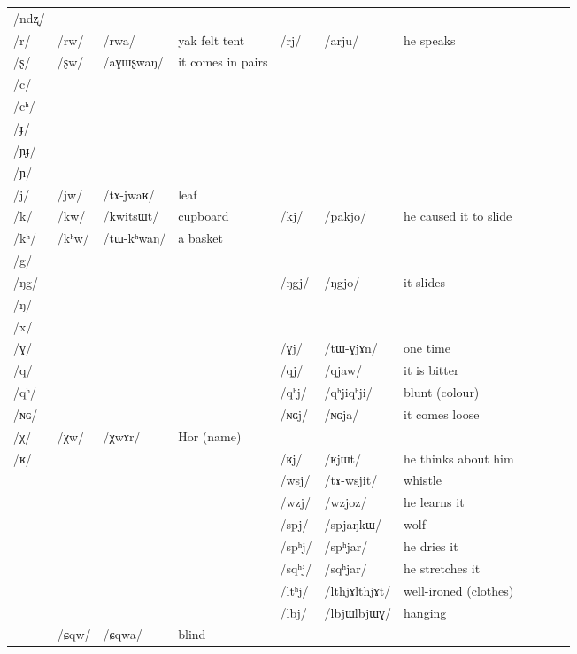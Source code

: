 \documentclass[oldfontcommands,oneside,a4paper,11pt]{article}
\newcommand{\ipa}[1]{/#1/} %
\newcommand{\tib}[1]{\cellcolor{lightgray}\textbf{#1}}
\newcommand{\idph}[1]{\cellcolor{gray}\textbf{#1}}
\begin{document}
\begin{table}
{\begin{tabular}{l|lll|lll|lll|l}
\ipa{ndʐ} &	 &	 &	&	 &	 &	\\
\ipa{r} &	\ipa{rw}\tib{} &	\ipa{rwa} &	yak felt tent&	\ipa{rj} &	\ipa{arju} &he speaks	\\
\ipa{ʂ} &	\ipa{ʂw} \tib{}&	\ipa{aɣɯʂwaŋ} &	it comes in pairs&	 &	 &	\\
\ipa{c} &	 &	 &	&	 &	 &	\\
\ipa{cʰ} &	 &	 &	&	 &	 &	\\
\ipa{ɟ} &	 &	 &	&	 &	 &	\\
\ipa{ɲɟ} &	 &	 &	&	 &	 &	\\
\ipa{ɲ} &	 &	 &	&	 &	 &	\\
\ipa{j} &	\ipa{jw} &	\ipa{tɤ-jwaʁ} &leaf	&	 &	 &	\\
\ipa{k} &	\ipa{kw}\tib{} &	\ipa{kwitsɯt} &	cupboard&	\ipa{kj} &	\ipa{pakjo} &he caused it to slide	\\
\ipa{kʰ} &	\ipa{kʰw}\tib{} &	\ipa{tɯ-kʰwaŋ} &a basket	&	 &	 &	\\
\ipa{g} &	 &	 &	&	 &	 &	\\
\ipa{ŋg} &	 &	 &	&	\ipa{ŋgj} &	\ipa{ŋgjo} &it  slides	\\
\ipa{ŋ} &	 &	 &	&	 &	 &	\\
\ipa{x} &	 &	 &	&	 &	 &	\\
\ipa{ɣ} &	 &	 &	&	\ipa{ɣj} &	\ipa{tɯ-ɣjɤn} &	one time\\
\ipa{q} &	 &	 &	&	\ipa{qj} &	\ipa{qjaw} &it is bitter	\\
\ipa{qʰ} &	 &	 &	&	\ipa{qʰj} \idph{}&	\ipa{qʰjiqʰji} &blunt (colour)	\\
\ipa{ɴɢ} &	 &	 &	&	\ipa{ɴɢj} &	\ipa{ɴɢja} &it comes loose	\\
\ipa{χ} &	\ipa{χw}\tib{} &	\ipa{χwɤr} &Hor (name)	&	 &	 &	\\
\ipa{ʁ} &	 &	 &	&	\ipa{ʁj} &	\ipa{ʁjɯt} &he 	thinks about him\\
\midrule
 &	 &	&&\ipa{wsj} &	\ipa{tɤ-wsjit} &whistle	\\
 &	 &	&&	\ipa{wzj}  \tib{}&	\ipa{wzjoz}  &he learns it	\\
\midrule
 &	 &	&&\ipa{spj} &	\ipa{spjaŋkɯ} &wolf	\\
 &	 &	&&\ipa{spʰj} &	\ipa{spʰjar} & he dries it	\\
 &	 &	&&\ipa{sqʰj} &	\ipa{sqʰjar} & he stretches it	\\
\midrule
 &	 &	&&\ipa{ltʰj}  \idph{}&	\ipa{lthjɤlthjɤt} &	well-ironed (clothes)\\
 &	 &	&&\ipa{lbj} \idph{}&	\ipa{lbjɯlbjɯɣ} &	hanging\\
\midrule
&\ipa{ɕqw}&\ipa{ɕqwa} &blind\\

\end{tabular}}
\end{table}
\end{document}
